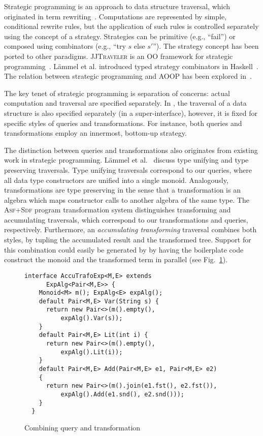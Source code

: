Strategic programming is an approach to data structure traversal,
which originated in term
rewriting~\cite{borovansky1996elan,visser1998core,vandenBrand:2003:TRT:941566.941568}.
Computations are represented by simple, conditional rewrite rules, but
the application of such rules is controlled separately using the
concept of a strategy.  Strategies can be primitive (e.g., ``fail'')
or composed using combinators (e.g., ``try $s$ else $s'$'').  The
strategy concept has been ported to other paradigms.
\textsc{JJTraveler} is an OO framework for strategic
programming~\cite{visser01visitor}.  L\"ammel et al. introduced typed
strategy combinators in Haskell~\cite{lammel2002typed}.  The relation
between strategic programming and AOOP has been explored
in~\cite{lammel2003strategic}.

The key tenet of strategic programming is separation of concerns:  actual computation and traversal are specified separately.
In \name, the traversal of a data structure is also specified separately (in a super-interface), however, it is fixed for specific styles of queries and transformations.
For instance, both queries and transformations employ an innermost, bottom-up strategy.

The distinction between queries and transformations also originates from existing work in strategic programming.
L\"ammel et al.~\cite{lammel2002typed} discuss type unifying and type preserving traversals.
Type unifying traversals correspond to our queries, where all data type constructors are unified into a single monoid.
Analogously, \name transformations are type preserving in the sense that a transformation is an algebra which maps constructor calls to another algebra of the same type.
The \textsc{Asf+Sdf} program transformation system distinguishes transforming and accumulating traversals, which correspond to our transformations and queries, respectively.
Furthermore, an \textit{accumulating transforming} traversal combines both styles, by tupling the accumulated result and the transformed tree.
Support for this combination could easily be generated by \name by having the boilerplate code construct the monoid and the transformed term in parallel (see Fig.~\ref{FIG:accuTrafo}).

\begin{figure}[t]
\nocaptionrule
\begin{lstlisting}[mathescape=true]
  interface AccuTrafoExp<M,E> extends
      ExpAlg<Pair<M,E>> {
    Monoid<M> m(); ExpAlg<E> expAlg();
    default Pair<M,E> Var(String s) {
      return new Pair<>(m().empty(),
          expAlg().Var(s));
    }
    default Pair<M,E> Lit(int i) {
      return new Pair<>(m().empty(),
          expAlg().Lit(i));
    }
    default Pair<M,E> Add(Pair<M,E> e1, Pair<M,E> e2)
    {
      return new Pair<>(m().join(e1.fst(), e2.fst()),
          expAlg().Add(e1.snd(), e2.snd()));
    }
  }
\end{lstlisting}
\caption{Combining query and transformation}
\label{FIG:accuTrafo}
\end{figure}

